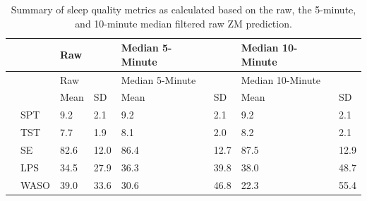 \documentclass[
  super,
  preprint,
  3p]{elsarticle}
\begin{document}
\hypertarget{tbl-summary_zm}{}
\begin{longtable}[]{@{}llllllll@{}}
\caption{\label{tbl-summary_zm}Summary of sleep quality metrics as
calculated based on the raw, the 5-minute, and 10-minute median filtered
raw ZM prediction.}\tabularnewline
\toprule\noalign{}
& & Raw & & Median 5-Minute & & Median 10-Minute & \\
\midrule\noalign{}
\endfirsthead
\toprule\noalign{}
& & Raw & & Median 5-Minute & & Median 10-Minute & \\
\midrule\noalign{}
\endhead
\bottomrule\noalign{}
\endlastfoot
& & Mean & SD & Mean & SD & Mean & SD \\
& SPT & 9.2 & 2.1 & 9.2 & 2.1 & 9.2 & 2.1 \\
& TST & 7.7 & 1.9 & 8.1 & 2.0 & 8.2 & 2.1 \\
& SE & 82.6 & 12.0 & 86.4 & 12.7 & 87.5 & 12.9 \\
& LPS & 34.5 & 27.9 & 36.3 & 39.8 & 38.0 & 48.7 \\
& WASO & 39.0 & 33.6 & 30.6 & 46.8 & 22.3 & 55.4 \\
\end{longtable}

\newpage


\renewcommand\refname{References}
  
\end{document}
